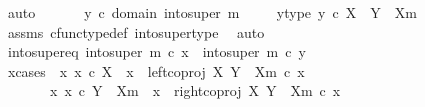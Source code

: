 \begin{isabellebody}
\ auto\isanewline
\ \ \isanewline
\ \ \isamarkupfalse%
\ {\isachardoublequoteopen}y\ {\isasymin}\isactrlsub c\ domain\ {\isacharparenleft}{\kern0pt}into{\isacharunderscore}{\kern0pt}super\ m{\isacharparenright}{\kern0pt}{\isachardoublequoteclose}\ \ \isamarkupfalse%
\ \isamarkupfalse%
\ y{\isacharunderscore}{\kern0pt}type{\isacharcolon}{\kern0pt}\ {\isachardoublequoteopen}y\ {\isasymin}\isactrlsub c\ X\ {\isasymCoprod}\ {\isacharparenleft}{\kern0pt}Y\ {\isasymsetminus}\ {\isacharparenleft}{\kern0pt}X{\isacharcomma}{\kern0pt}m{\isacharparenright}{\kern0pt}{\isacharparenright}{\kern0pt}{\isachardoublequoteclose}\isanewline
\ \ \ \ \isamarkupfalse%
\ assms\ cfunc{\isacharunderscore}{\kern0pt}type{\isacharunderscore}{\kern0pt}def\ into{\isacharunderscore}{\kern0pt}super{\isacharunderscore}{\kern0pt}type\ \isamarkupfalse%
\ auto\isanewline
\isanewline
\ \ \isamarkupfalse%
\ into{\isacharunderscore}{\kern0pt}super{\isacharunderscore}{\kern0pt}eq{\isacharcolon}{\kern0pt}\ {\isachardoublequoteopen}into{\isacharunderscore}{\kern0pt}super\ m\ {\isasymcirc}\isactrlsub c\ x\ {\isacharequal}{\kern0pt}\ into{\isacharunderscore}{\kern0pt}super\ m\ {\isasymcirc}\isactrlsub c\ y{\isachardoublequoteclose}\isanewline
\isanewline
\ \ \isamarkupfalse%
\ x{\isacharunderscore}{\kern0pt}cases{\isacharcolon}{\kern0pt}\ {\isachardoublequoteopen}{\isacharparenleft}{\kern0pt}{\isasymexists}\ x{\isacharprime}{\kern0pt}{\isachardot}{\kern0pt}\ x{\isacharprime}{\kern0pt}\ {\isasymin}\isactrlsub c\ X\ {\isasymand}\ x\ {\isacharequal}{\kern0pt}\ left{\isacharunderscore}{\kern0pt}coproj\ X\ {\isacharparenleft}{\kern0pt}Y\ {\isasymsetminus}\ {\isacharparenleft}{\kern0pt}X{\isacharcomma}{\kern0pt}m{\isacharparenright}{\kern0pt}{\isacharparenright}{\kern0pt}\ {\isasymcirc}\isactrlsub c\ x{\isacharprime}{\kern0pt}{\isacharparenright}{\kern0pt}\isanewline
\ \ \ \ {\isasymor}\ \ {\isacharparenleft}{\kern0pt}{\isasymexists}\ x{\isacharprime}{\kern0pt}{\isachardot}{\kern0pt}\ x{\isacharprime}{\kern0pt}\ {\isasymin}\isactrlsub c\ Y\ {\isasymsetminus}\ {\isacharparenleft}{\kern0pt}X{\isacharcomma}{\kern0pt}m{\isacharparenright}{\kern0pt}\ {\isasymand}\ x\ {\isacharequal}{\kern0pt}\ right{\isacharunderscore}{\kern0pt}coproj\ X\ {\isacharparenleft}{\kern0pt}Y\ {\isasymsetminus}\ {\isacharparenleft}{\kern0pt}X{\isacharcomma}{\kern0pt}m{\isacharparenright}{\kern0pt}{\isacharparenright}{\kern0pt}\ {\isasymcirc}\isactrlsub c\ x{\isacharprime}{\kern0pt}{\isacharparenright}{\kern0pt}{\isachardoublequoteclose}\isanewline

\end{isabellebody}
